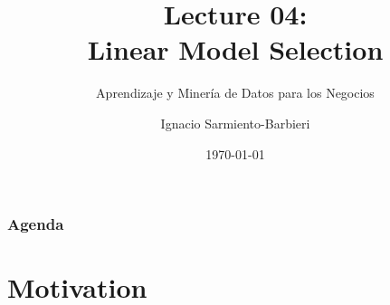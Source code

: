\documentclass[
  shownotes,
  xcolor={svgnames},
  hyperref={colorlinks,citecolor=DarkBlue,linkcolor=DarkRed,urlcolor=DarkBlue}
  , aspectratio=169]{beamer}
\begin{document}
\title[Lecture 04]{Lecture 04: \\ Linear Model Selection}
\subtitle{Aprendizaje y Minería de Datos para los Negocios}
\date{\today}

\author[Sarmiento-Barbieri]{Ignacio Sarmiento-Barbieri}


\begin{frame}[noframenumbering]
\maketitle
\end{frame}





\begin{frame}
\frametitle{Agenda}

\tableofcontents

\end{frame}

\section{Motivation }
\end{document}
